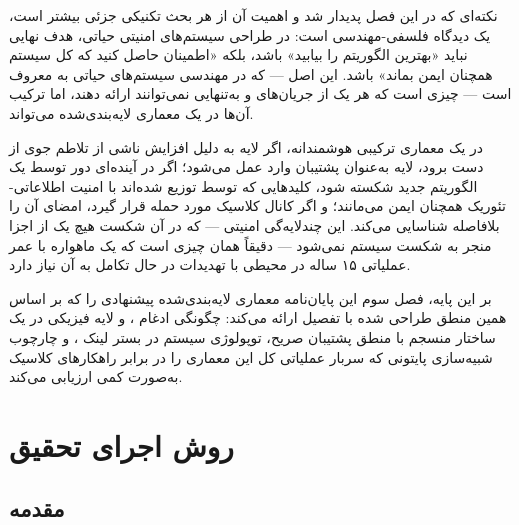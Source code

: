 \documentclass[a4paper,14pt]{extreport}
\begin{document}
نکته‌ای که در این فصل پدیدار شد و اهمیت آن از هر بحث تکنیکی جزئی بیشتر است، یک دیدگاه فلسفی-مهندسی است: در طراحی سیستم‌های امنیتی حیاتی، هدف نهایی نباید «بهترین الگوریتم را بیابید» باشد، بلکه «اطمینان حاصل کنید که کل سیستم همچنان ایمن بماند» باشد. این اصل --- که در مهندسی سیستم‌های حیاتی به  معروف است --- چیزی است که هر یک از جریان‌های  و  به‌تنهایی نمی‌توانند ارائه دهند، اما ترکیب آن‌ها در یک معماری لایه‌بندی‌شده می‌تواند.

در یک معماری ترکیبی هوشمندانه، اگر لایه  به دلیل افزایش  ناشی از تلاطم جوی از دست برود، لایه  به‌عنوان پشتیبان  وارد عمل می‌شود؛ اگر  در آینده‌ای دور توسط یک الگوریتم جدید شکسته شود، کلیدهایی که توسط  توزیع شده‌اند با امنیت اطلاعاتی-تئوریک همچنان ایمن می‌مانند؛ و اگر کانال کلاسیک  مورد حمله قرار گیرد، امضای  آن را بلافاصله شناسایی می‌کند. این چندلایه‌گی امنیتی --- که در آن شکست هیچ یک از اجزا منجر به شکست سیستم نمی‌شود --- دقیقاً همان چیزی است که یک ماهواره با عمر عملیاتی ۱۵ ساله در محیطی با تهدیدات در حال تکامل به آن نیاز دارد.

بر این پایه، فصل سوم این پایان‌نامه معماری لایه‌بندی‌شده پیشنهادی را که بر اساس همین منطق طراحی شده با تفصیل ارائه می‌کند: چگونگی ادغام ،  و لایه فیزیکی  در یک ساختار منسجم با منطق پشتیبان صریح، توپولوژی سیستم در بستر لینک ، و چارچوب شبیه‌سازی پایتونی که سربار عملیاتی کل این معماری را در برابر راهکارهای کلاسیک به‌صورت کمی ارزیابی می‌کند.


\chapter{روش اجرای تحقیق}
\setcounter{figure}{0}
\setcounter{table}{0}
\setcounter{equation}{0}

\section{مقدمه}
\end{document}
